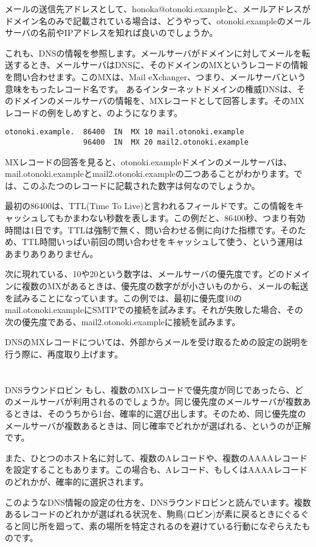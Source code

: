 メールの送信先アドレスとして、honoka@otonoki.exampleと、メールアドレスがドメイン名のみで記載されている場合は、どうやって、otonoki.exampleのメールサーバの名前やIPアドレスを知れば良いのでしょうか。

これも、DNSの情報を参照します。メールサーバがドメインに対してメールを転送するとき、メールサーバはDNSに、そのドメインのMXというレコードの情報を問い合わせます。このMXは、Mail eXchanger、つまり、メールサーバという意味をもったレコード名です。
あるインターネットドメインの権威DNSは、そのドメインのメールサーバの情報を、MXレコードとして回答します。そのMXレコードの例をしめすと、のようになります。

\begin{verbatim}
otonoki.example.  86400  IN  MX 10 mail.otonoki.example
                  96400  IN  MX 20 mail2.otonoki.example
\end{verbatim}

MXレコードの回答を見ると、otonoki.exampleドメインのメールサーバは、mail.otonoki.exampleとmail2.otonoki.exampleの二つあることがわかります。では、このふたつのレコードに記載された数字は何なのでしょうか。

最初の86400は、TTL(Time To Live)と言われるフィールドです。この情報をキャッシュしてもかまわない秒数を表します。この例だと、86400秒、つまり有効時間は1日です。TTLは強制で無く、問い合わせる側に向けた指標です。そのため、TTL時間いっぱい前回の問い合わせをキャッシュして使う、という運用はあまりありありません。

次に現れている、10や20という数字は、メールサーバの優先度です。どのドメインに複数のMXがあるときは、優先度の数字がが小さいものから、メールの転送を試みることになっています。この例では、最初に優先度10のmail.otonoki.exampleにSMTPでの接続を試みます。それが失敗した場合、その次の優先度である、mail2.otonoki.exampleに接続を試みます。

DNSのMXレコードについては、外部からメールを受け取るための設定の説明を行う際に、再度取り上げます。

\section*{}
\begin{itembox}[l]{DNSラウンドロビン}
もし、複数のMXレコードで優先度が同じであったら、どのメールサーバが利用されるのでしょうか。同じ優先度のメールサーバが複数あるときは、そのうちから1台、確率的に選び出します。そのため、同じ優先度のメールサーバが複数あるときは、同じ確率でどれかが選ばれる、というのが正解です。

また、ひとつのホスト名に対して、複数のAレコードや、複数のAAAAレコードを設定することもあります。この場合も、Aレコード、もしくはAAAAレコードのどれかが、確率的に選択されます。

このようなDNS情報の設定の仕方を、DNSラウンドロビンと読んでいます。複数あるレコードのどれかが選ばれる状況を、駒鳥(ロビン)が素に戻るときにぐるぐると同じ所を廻って、素の場所を特定されるのを避けている行動になぞらえたものです。
\end{itembox}


